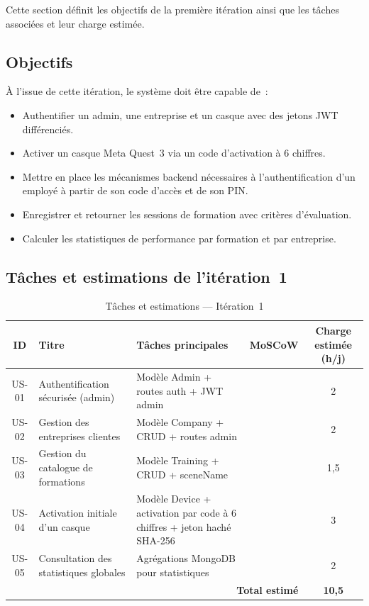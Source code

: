Cette section définit les objectifs de la première itération ainsi que les tâches
associées et leur charge estimée.

\subsection{Objectifs}

À l'issue de cette itération, le système doit être capable de~:
\begin{itemize}
  \item Authentifier un admin, une entreprise et un casque avec des jetons JWT différenciés.
  \item Activer un casque Meta Quest~3 via un code d'activation à 6 chiffres.
  \item Mettre en place les mécanismes backend nécessaires à l'authentification
d'un employé à partir de son code d'accès et de son PIN.
  \item Enregistrer et retourner les sessions de formation avec critères d'évaluation.
  \item Calculer les statistiques de performance par formation et par entreprise.
\end{itemize}

\subsection{Tâches et estimations de l'itération~1}

\begin{table}[H]
  \centering
  \small
  \setlength{\tabcolsep}{5pt}
  \begin{tabularx}{\textwidth}{cp{3.5cm}Xcc}
    \toprule
    \textbf{ID} & \textbf{Titre} & \textbf{Tâches principales} & \textbf{MoSCoW} & \textbf{\footnotesize Charge estimée (h/j)} \\
    \midrule
    US-01 & Authentification sécurisée (admin) &
      Modèle Admin + routes auth + JWT admin & \must{} & 2 \\
    US-02 & Gestion des entreprises clientes &
      Modèle Company + CRUD + routes admin & \must{} & 2 \\
    US-03 & Gestion du catalogue de formations &
      Modèle Training + CRUD + sceneName & \must{} & 1,5 \\
    US-04 & Activation initiale d'un casque &
      Modèle Device + activation par code à 6 chiffres + jeton haché SHA-256 & \must{} & 3 \\
    US-05 & Consultation des statistiques globales &
      Agrégations MongoDB pour statistiques & \should{} & 2 \\
    \midrule
    \multicolumn{4}{r}{\textbf{Total estimé}} & \textbf{10,5} \\
    \bottomrule
  \end{tabularx}
  \caption{Tâches et estimations --- Itération~1}
  \label{tab:backlog_s1}
\end{table}

